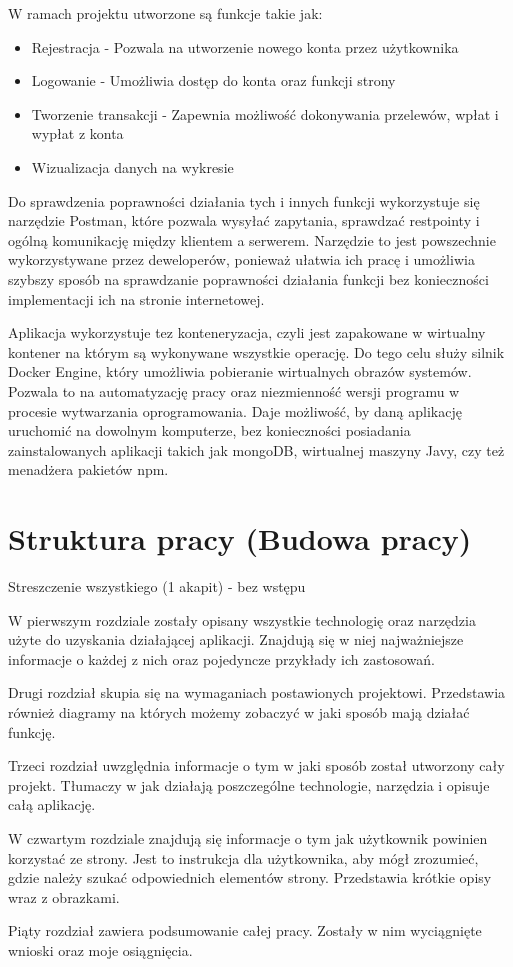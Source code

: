 W ramach projektu utworzone są funkcje takie jak:
\begin{itemize}
	\item Rejestracja - Pozwala na utworzenie nowego konta przez użytkownika
	\item Logowanie - Umożliwia dostęp do konta oraz funkcji strony
	\item Tworzenie transakcji - Zapewnia możliwość dokonywania przelewów, wpłat i wypłat z konta
	\item Wizualizacja danych na wykresie
\end{itemize}
Do sprawdzenia poprawności działania tych i innych funkcji wykorzystuje się narzędzie Postman, które pozwala wysyłać zapytania, sprawdzać restpointy i ogólną komunikację między klientem a serwerem. Narzędzie to jest powszechnie wykorzystywane przez deweloperów, ponieważ ułatwia ich pracę i umożliwia szybszy sposób na sprawdzanie poprawności działania funkcji bez konieczności implementacji ich na stronie internetowej. 

Aplikacja wykorzystuje tez konteneryzacja, czyli jest zapakowane w wirtualny kontener na którym są wykonywane wszystkie operację. Do tego celu służy silnik Docker Engine, który umożliwia pobieranie wirtualnych obrazów systemów. Pozwala to na automatyzację pracy oraz niezmienność wersji programu w procesie wytwarzania oprogramowania. Daje możliwość, by daną aplikację uruchomić na dowolnym komputerze, bez konieczności posiadania zainstalowanych aplikacji takich jak mongoDB, wirtualnej maszyny Javy, czy też menadżera pakietów npm.


\section*{Struktura pracy (Budowa pracy)}
Streszczenie wszystkiego (1 akapit) - bez wstępu 

W pierwszym rozdziale zostały opisany wszystkie technologię oraz narzędzia użyte do uzyskania działającej aplikacji. Znajdują się w niej najważniejsze informacje o każdej z nich oraz pojedyncze przykłady ich zastosowań.

Drugi rozdział skupia się na wymaganiach postawionych projektowi. Przedstawia również diagramy na których możemy zobaczyć w jaki sposób mają działać funkcję.

Trzeci rozdział uwzględnia informacje o tym w jaki sposób został utworzony cały projekt. Tłumaczy w jak działają poszczególne technologie, narzędzia i opisuje całą aplikację.

W czwartym rozdziale znajdują się informacje o tym jak użytkownik powinien korzystać ze strony. Jest to instrukcja dla użytkownika, aby mógł zrozumieć, gdzie należy szukać odpowiednich elementów strony. Przedstawia krótkie opisy wraz z obrazkami. 

Piąty rozdział zawiera podsumowanie całej pracy. Zostały w nim wyciągnięte wnioski oraz moje osiągnięcia.